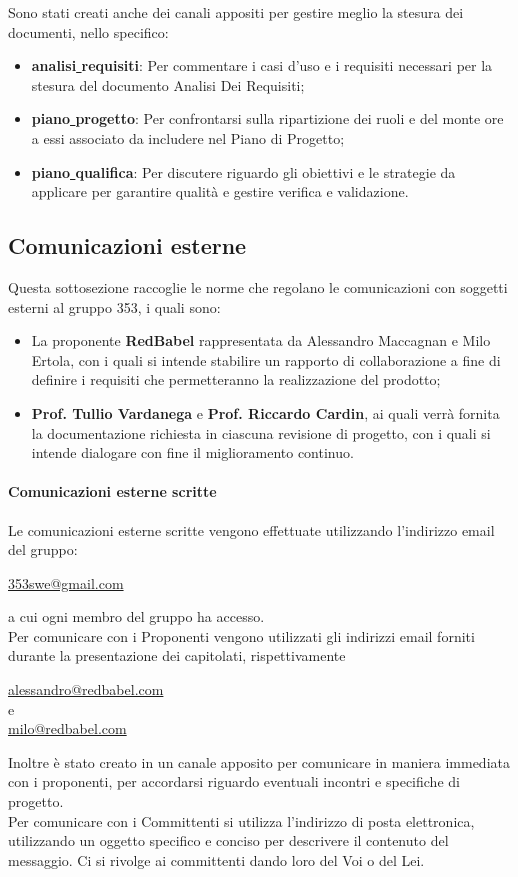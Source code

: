 \documentclass[NormeDiProgetto.tex]{subfiles}
\begin{document}
	Sono stati creati anche dei canali appositi per gestire meglio la stesura dei documenti, nello specifico:
	\begin{itemize}
		\item \textbf{analisi\underline{ }requisiti}: Per commentare i casi d'uso e i requisiti necessari per la stesura del documento Analisi Dei Requisiti;
		\item \textbf{piano\underline{ }progetto}: Per confrontarsi sulla ripartizione dei ruoli e del monte ore a essi associato da includere nel Piano di Progetto;
		\item \textbf{piano\underline{ }qualifica}: Per discutere riguardo gli obiettivi e le strategie da applicare per garantire qualità e gestire verifica e validazione.
	\end{itemize}
	
	\subsection{Comunicazioni esterne}
	Questa sottosezione raccoglie le norme che regolano le comunicazioni con soggetti esterni al gruppo 353, i quali sono:
	\begin{itemize}
		\item La proponente \textbf{RedBabel} rappresentata da Alessandro Maccagnan e Milo Ertola, con i quali si intende stabilire un rapporto di collaborazione a fine di definire i requisiti che permetteranno la realizzazione del prodotto;
		\item \textbf{Prof. Tullio Vardanega} e \textbf{Prof. Riccardo Cardin}, ai quali verrà fornita la documentazione richiesta in ciascuna revisione di progetto, con i quali si intende dialogare con fine il miglioramento continuo.
	\end{itemize}
	\paragraph{Comunicazioni esterne scritte}
	Le comunicazioni esterne scritte vengono effettuate utilizzando l'indirizzo email del gruppo:
	\begin{center}
		\href {353swe@gmail.com}{353swe@gmail.com}
	\end{center}
	a cui ogni membro del gruppo ha accesso.\\
	Per comunicare con i Proponenti vengono utilizzati gli indirizzi email forniti durante la presentazione dei capitolati, rispettivamente 
	\begin{center}
		\href{alessandro@redbabel.com}{alessandro@redbabel.com} \\
		e\\
		\href{milo@redbabel.com}{milo@redbabel.com}
		
	\end{center}
	Inoltre è stato creato in  un canale apposito per comunicare in maniera immediata con i proponenti, per accordarsi riguardo eventuali incontri e specifiche di progetto.\\
	Per comunicare con i Committenti si utilizza l'indirizzo di posta elettronica, utilizzando un oggetto specifico e conciso per descrivere il contenuto del messaggio. Ci si rivolge ai committenti dando loro del Voi o del Lei.
	
\end{document}
